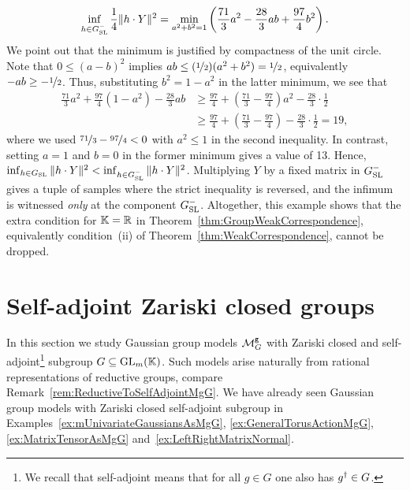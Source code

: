\begin{example}
	\[ \inf_{h \in G_{\operatorname{SL}}^-} \frac{1}{4} \| h \cdot Y \|^2 = \min_{ a^2+b^2=1} \left( \frac{71}{3} a^2- \frac{28}{3} ab + \frac{97}{4} b^2 \right) .\]
	We point out that the minimum is justified by compactness of the unit circle.
	Note that $0 \leq (a-b)^2$ implies $ab \leq (\nicefrac{1}{2})(a^2 + b^2) = \nicefrac{1}{2}$, equivalently $-ab \geq - \nicefrac{1}{2}$. Thus, substituting $b^2 = 1 - a^2$ in the latter minimum, we see that
		\begin{align*}
			\frac{71}{3} a^2 + \frac{97}{4} (1 - a^2) - \frac{28}{3} ab
			&\geq \frac{97}{4} + \left( \frac{71}{3} - \frac{97}{4} \right) a^2 - \frac{28}{3} \cdot \frac{1}{2} \\
			&\geq \frac{97}{4} + \left( \frac{71}{3} - \frac{97}{4} \right) - \frac{28}{3} \cdot \frac{1}{2} = 19,
		\end{align*}
	where we used $\nicefrac{71}{3} - \nicefrac{97}{4} < 0$ with $a^2 \leq 1$ in the second inequality.
	In contrast, setting $a = 1$ and $b=0$ in the former minimum gives a value of 13. 
	Hence, $ \inf_{h \in G_{\operatorname{SL}}} \| h \cdot Y \|^2 < \inf_{h \in G_{\operatorname{SL}}^-} \| h \cdot Y \|^2$. Multiplying $Y$ by a fixed matrix in $G_{\operatorname{SL}}^-$ gives a tuple of samples where the strict inequality is reversed, and the infimum is witnessed \emph{only} at the component $G_{\operatorname{SL}}^-$. Altogether, this example shows that the extra condition for $\mathbb K = \mathbb R$ in Theorem~\ref{thm:GroupWeakCorrespondence}, equivalently condition~(ii) of Theorem~\ref{thm:WeakCorrespondence}, cannot be dropped.
	\hfill\exSymbol
\end{example}




\section{Self-adjoint Zariski closed groups}\label{sec:SelfAdjointMgG}

In this section we study Gaussian group models $\mathcal{M}^{\mathtt{g}}_G$ with Zariski closed and self-adjoint\footnote{We recall that self-adjoint means that for all $g \in G$ one also has $g^{\dagger} \in G$.} subgroup $G \subseteq \operatorname{GL}_m(\mathbb K)$. Such models arise naturally from rational representations of reductive groups, compare Remark~\ref{rem:ReductiveToSelfAdjointMgG}.
We have already seen Gaussian group models with Zariski closed self-adjoint subgroup in Examples~\ref{ex:mUnivariateGaussiansAsMgG}, \ref{ex:GeneralTorusActionMgG}, \ref{ex:MatrixTensorAsMgG} and~\ref{ex:LeftRightMatrixNormal}.


